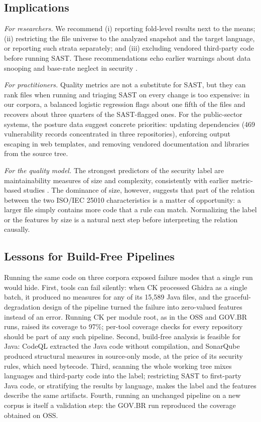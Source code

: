 \documentclass[a4paper,twoside]{article}
\begin{document}
\subsection{Implications}

\textit{For researchers.} We recommend (i) reporting fold-level results next to the means; (ii) restricting the file universe to the analyzed snapshot and the target language, or reporting such strata separately; and (iii) excluding vendored third-party code before running SAST. These recommendations echo earlier warnings about data snooping and base-rate neglect in security \cite{arp2022}.

\textit{For practitioners.} Quality metrics are not a substitute for SAST, but they can rank files when running and triaging SAST on every change is too expensive: in our corpora, a balanced logistic regression flags about one fifth of the files and recovers about three quarters of the SAST-flagged ones. For the public-sector systems, the posture data suggest concrete priorities: updating dependencies (469 vulnerability records concentrated in three repositories), enforcing output escaping in web templates, and removing vendored documentation and libraries from the source tree.

\textit{For the quality model.} The strongest predictors of the security label are maintainability measures of size and complexity, consistently with earlier metric-based studies \cite{shin2011,chowdhury2011,siavvas2020}. The dominance of size, however, suggests that part of the relation between the two ISO/IEC 25010 characteristics is a matter of opportunity: a larger file simply contains more code that a rule can match. Normalizing the label or the features by size is a natural next step before interpreting the relation causally.

\subsection{Lessons for Build-Free Pipelines}

Running the same code on three corpora exposed failure modes that a single run would hide. First, tools can fail silently: when CK processed Ghidra as a single batch, it produced no measures for any of its 15,589 Java files, and the graceful-degradation design of the pipeline turned the failure into zero-valued features instead of an error. Running CK per module root, as in the OSS and GOV.BR runs, raised its coverage to 97\%; per-tool coverage checks for every repository should be part of any such pipeline. Second, build-free analysis is feasible for Java: CodeQL extracted the Java code without compilation, and SonarQube produced structural measures in source-only mode, at the price of its security rules, which need bytecode. Third, scanning the whole working tree mixes languages and third-party code into the label; restricting SAST to first-party Java code, or stratifying the results by language, makes the label and the features describe the same artifacts. Fourth, running an unchanged pipeline on a new corpus is itself a validation step: the GOV.BR run reproduced the coverage obtained on OSS.
\end{document}
